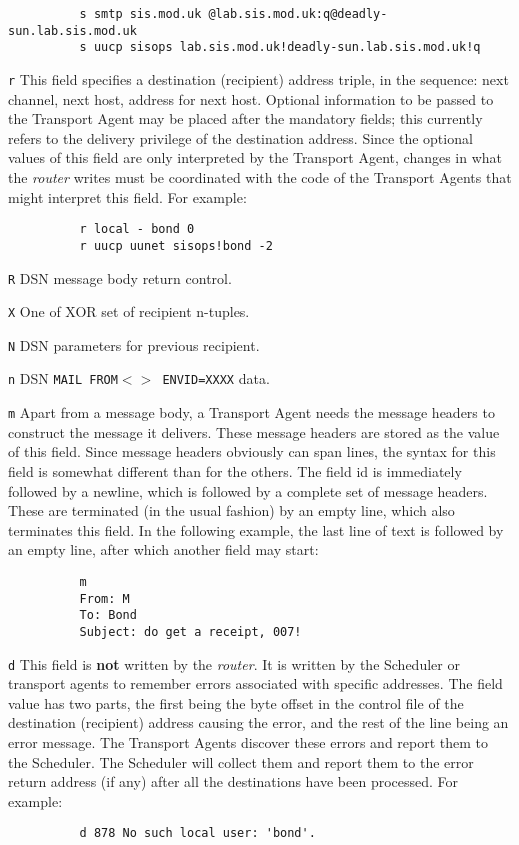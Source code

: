 \begin{verbatim}
          s smtp sis.mod.uk @lab.sis.mod.uk:q@deadly-sun.lab.sis.mod.uk
          s uucp sisops lab.sis.mod.uk!deadly-sun.lab.sis.mod.uk!q
\end{verbatim}


{\tt r}     
This field specifies a destination (recipient) address triple, in the
sequence: next channel, next host, address for next host.  Optional
information to be passed to the Transport Agent may be placed after the
mandatory fields; this currently refers to the delivery privilege of the
destination address.  Since the optional values of this field are only
interpreted by the Transport Agent, changes in what the {\em router\/} writes
must be coordinated with the code of the Transport Agents that might
interpret this field.  For example:

\begin{verbatim}
          r local - bond 0
          r uucp uunet sisops!bond -2
\end{verbatim}


{\tt R}
DSN message body return control.

{\tt X}
One of XOR set of recipient n-tuples.

{\tt N}
DSN parameters for previous recipient.

{\tt n}
DSN {\tt MAIL FROM{\(<\)}{\(>\)} ENVID=XXXX} data.

{\tt m}     
Apart from a message body, a Transport Agent needs the message headers
to construct the message it delivers.  These message headers are
stored as the value of this field.  Since message headers obviously
can span lines, the syntax for this field is somewhat different than
for the others.  The field id is immediately followed by a newline,
which is followed by a complete set of message headers.  These are
terminated (in the usual fashion) by an empty line, which also
terminates this field.  In the following example, the last line of
text is followed by an empty line, after which another field may
start:

\begin{verbatim}
          m
          From: M
          To: Bond
          Subject: do get a receipt, 007!
\end{verbatim}


{\tt d}     
This field is {\bf not} written by the {\em router\/}.  It is written by the
Scheduler or transport agents to remember errors associated with specific addresses. The
field value has two parts, the first being the byte offset in the
control file of the destination (recipient) address causing the error,
and the rest of the line being an error message.  The Transport Agents
discover these errors and report them to the Scheduler.  The Scheduler
will collect them and report them to the error return address (if any)
after all the destinations have been processed.
For example:
\begin{verbatim}
          d 878 No such local user: 'bond'.
\end{verbatim}
     

